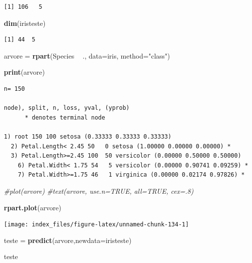 \documentclass[12pt,brazil,oneside]{book}
\newenvironment{Shaded}{\begin{snugshade}}{\end{snugshade}}
\newcommand{\CommentTok}[1]{\textcolor[rgb]{0.56,0.35,0.01}{\textit{#1}}}
\newcommand{\DataTypeTok}[1]{\textcolor[rgb]{0.13,0.29,0.53}{#1}}
\newcommand{\KeywordTok}[1]{\textcolor[rgb]{0.13,0.29,0.53}{\textbf{#1}}}
\newcommand{\NormalTok}[1]{#1}
\newcommand{\OperatorTok}[1]{\textcolor[rgb]{0.81,0.36,0.00}{\textbf{#1}}}
\newcommand{\StringTok}[1]{\textcolor[rgb]{0.31,0.60,0.02}{#1}}
\begin{document}
\begin{verbatim}
[1] 106   5
\end{verbatim}

\begin{Shaded}
\begin{Highlighting}[]
\KeywordTok{dim}\NormalTok{(iristeste)}
\end{Highlighting}
\end{Shaded}

\begin{verbatim}
[1] 44  5
\end{verbatim}

\begin{Shaded}
\begin{Highlighting}[]
\NormalTok{arvore =}\StringTok{ }\KeywordTok{rpart}\NormalTok{(Species }\OperatorTok{~}\StringTok{ }\NormalTok{., }\DataTypeTok{data=}\NormalTok{iris,  }\DataTypeTok{method=}\StringTok{"class"}\NormalTok{)}

\KeywordTok{print}\NormalTok{(arvore)}
\end{Highlighting}
\end{Shaded}

\begin{verbatim}
n= 150 

node), split, n, loss, yval, (yprob)
      * denotes terminal node

1) root 150 100 setosa (0.33333 0.33333 0.33333)  
  2) Petal.Length< 2.45 50   0 setosa (1.00000 0.00000 0.00000) *
  3) Petal.Length>=2.45 100  50 versicolor (0.00000 0.50000 0.50000)  
    6) Petal.Width< 1.75 54   5 versicolor (0.00000 0.90741 0.09259) *
    7) Petal.Width>=1.75 46   1 virginica (0.00000 0.02174 0.97826) *
\end{verbatim}

\begin{Shaded}
\begin{Highlighting}[]
\CommentTok{#plot(arvore)}
\CommentTok{#text(arvore, use.n=TRUE, all=TRUE, cex=.8)}

\KeywordTok{rpart.plot}\NormalTok{(arvore)}
\end{Highlighting}
\end{Shaded}

\begin{center}\texttt{[image: index\_files/figure-latex/unnamed-chunk-134-1]} \end{center}

\begin{Shaded}
\begin{Highlighting}[]
\NormalTok{teste =}\StringTok{ }\KeywordTok{predict}\NormalTok{(arvore,}\DataTypeTok{newdata=}\NormalTok{iristeste)}

\NormalTok{teste}
\end{Highlighting}
\end{Shaded}
\end{document}
